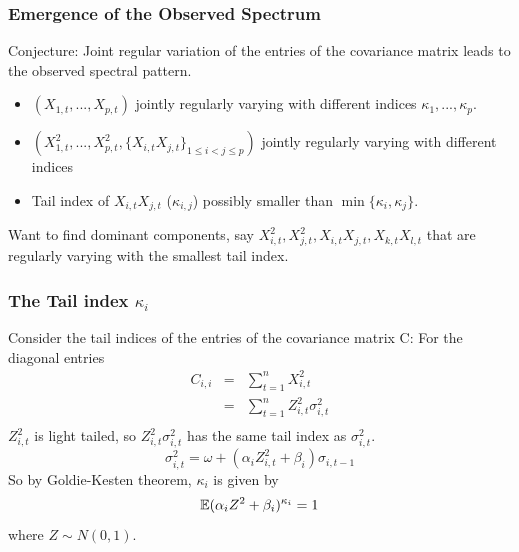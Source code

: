 \documentclass{beamer}
\begin{document}
\begin{frame}
  \frametitle{Emergence of the Observed Spectrum}
  Conjecture: Joint regular variation of the entries of the covariance
  matrix leads to the observed spectral pattern.
  \begin{itemize}
  \item $(X_{1,t}, ..., X_{p,t})$ jointly regularly varying with
    different indices $\kappa_1, ..., \kappa_p$.
  \item $(X_{1,t}^2, ..., X_{p,t}^2, \{X_{i,t} X_{j,t}\}_{1 \leq i < j
      \leq p})$ jointly regularly varying with different indices
  \item Tail index of $X_{i,t} X_{j,t}$ ($\kappa_{i,j}$) possibly
    smaller than $\min\{\kappa_i, \kappa_j\}$.
  \end{itemize}
  Want to find dominant components, say $X_{i,t}^2, X_{j,t}^2,
  X_{i,t} X_{j,t}, X_{k,t} X_{l,t}$ that are regularly varying with
  the smallest tail index.
\end{frame}

\begin{frame}
  \frametitle{The Tail index $\kappa_i$}
  Consider the tail indices of the entries of the covariance matrix C:
  For the diagonal entries
    \begin{eqnarray*}
      C_{i, i} &=& \sum_{t=1}^n X_{i, t}^2 \\
               &=& \sum_{t=1}^n Z_{i, t}^2 \sigma_{i, t}^2 \\
    \end{eqnarray*}
    $Z_{i, t}^2$ is light tailed, so $Z_{i, t}^2 \sigma_{i, t}^2$ has
    the same tail index as $\sigma_{i, t}^2$.
    \[
    \sigma_{i, t}^2 = \omega + (\alpha_i Z_{i,t}^2 + \beta_i)\sigma_{i,t-1}
    \]
    So by Goldie-Kesten theorem, $\kappa_i$ is given by
    \[
    \mathbb{E} (\alpha_i Z^2 + \beta_i)^{\kappa_i} = 1
    \]
    where $Z \sim N(0, 1)$.
  \end{frame}
\end{document}
